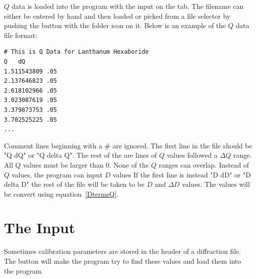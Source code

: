 $Q$ data is loaded into the program with the 
input on the  tab. The filename can either 
be entered by hand and then loaded or picked from a file selector 
by pushing the button with the folder icon on it.  Below is an example 
of the $Q$ data file format: 
\begin{lstlisting}[caption={Lanthanum Hexaboride.dat},label=LaB6]
# This is Q Data for Lanthanum Hexaboride
Q   dQ
1.511543809 .05
2.137646823 .05
2.618102966 .05
3.023087619 .05
3.379873753 .05
3.702525225 .05
...
\end{lstlisting}
Comment lines beginning with a \# are ignored. The
first line in the file should be "Q  dQ" or "Q  delta Q". The 
rest of the are lines of $Q$ values followed a $\Delta Q$ range.
All $Q$ values must be larger than 0. None of the $Q$ ranges can 
overlap. Instead of $Q$ values, the program can input $D$ values 
If the first line is instead "D dD" or "D delta D" the rest of 
the file will be taken to be $D$ and $\Delta D$ values.
The values will be convert using equation~\ref{DtermsQ}. 

\section{\texorpdfstring{The  Input}
    {The ''Get From Header Input''}}

Sometimes calibration parameters are stored in the header of
a diffraction file.  The  button will 
make the program try to find these values and load them into the 
program.
